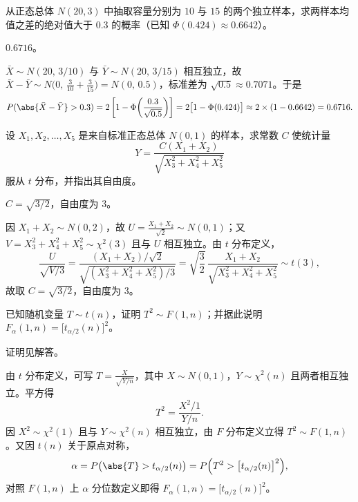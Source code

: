 \begin{exercise}
从正态总体 $N(20,3)$ 中抽取容量分别为 $10$ 与 $15$ 的两个独立样本，求两样本均值之差的绝对值大于 $0.3$ 的概率（已知 $\Phi(0.424)\approx 0.6642$）。
\begin{answer}
$0.6716$。
\end{answer}
\begin{solution}
$\bar{X}\sim N(20,\,3/10)$ 与 $\bar{Y}\sim N(20,\,3/15)$ 相互独立，故 $\bar{X}-\bar{Y}\sim N\bigl(0,\,\frac{3}{10}+\frac{3}{15}\bigr)=N(0,\,0.5)$，标准差为 $\sqrt{0.5}\approx 0.7071$。于是
\[
  P(\abs{\bar{X}-\bar{Y}}>0.3)=2\left[1-\Phi\!\left(\frac{0.3}{\sqrt{0.5}}\right)\right]
  =2\bigl[1-\Phi(0.424)\bigr]\approx 2\times(1-0.6642)=0.6716.
\]
\end{solution}
\end{exercise}

\begin{exercise}
设 $X_1,X_2,\ldots,X_5$ 是来自标准正态总体 $N(0,1)$ 的样本，求常数 $C$ 使统计量
\[
  Y=\frac{C(X_1+X_2)}{\sqrt{X_3^2+X_4^2+X_5^2}}
\]
服从 $t$ 分布，并指出其自由度。
\begin{answer}
$C=\sqrt{3/2}$，自由度为 $3$。
\end{answer}
\begin{solution}
因 $X_1+X_2\sim N(0,2)$，故 $U=\frac{X_1+X_2}{\sqrt{2}}\sim N(0,1)$；又 $V=X_3^2+X_4^2+X_5^2\sim\chi^2(3)$ 且与 $U$ 相互独立。由 $t$ 分布定义，
\[
  \frac{U}{\sqrt{V/3}}=\frac{(X_1+X_2)/\sqrt{2}}{\sqrt{(X_3^2+X_4^2+X_5^2)/3}}
  =\sqrt{\frac{3}{2}}\,\frac{X_1+X_2}{\sqrt{X_3^2+X_4^2+X_5^2}}\sim t(3),
\]
故取 $C=\sqrt{3/2}$，自由度为 $3$。
\end{solution}
\end{exercise}

\begin{exercise}
已知随机变量 $T\sim t(n)$，证明 $T^2\sim F(1,n)$；并据此说明 $F_\alpha(1,n)=\bigl[t_{\alpha/2}(n)\bigr]^2$。
\begin{answer}
证明见解答。
\end{answer}
\begin{solution}
由 $t$ 分布定义，可写 $T=\frac{X}{\sqrt{Y/n}}$，其中 $X\sim N(0,1)$，$Y\sim\chi^2(n)$ 且两者相互独立。平方得
\[
  T^2=\frac{X^2/1}{Y/n}.
\]
因 $X^2\sim\chi^2(1)$ 且与 $Y\sim\chi^2(n)$ 相互独立，由 $F$ 分布定义立得 $T^2\sim F(1,n)$。又因 $t(n)$ 关于原点对称，
\[
  \alpha=P\bigl(\abs{T}>t_{\alpha/2}(n)\bigr)=P\Bigl(T^2>\bigl[t_{\alpha/2}(n)\bigr]^2\Bigr),
\]
对照 $F(1,n)$ 上 $\alpha$ 分位数定义即得 $F_\alpha(1,n)=\bigl[t_{\alpha/2}(n)\bigr]^2$。
\end{solution}
\end{exercise}

